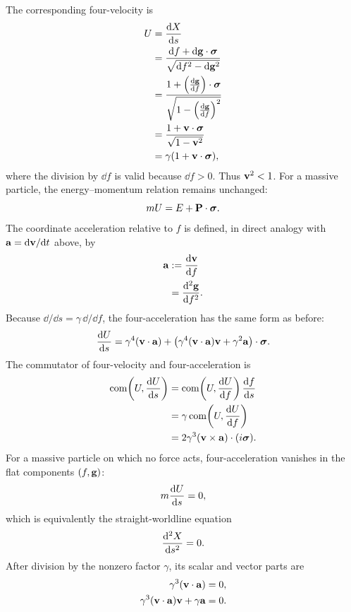 The corresponding four-velocity is
\begin{align*}
U
&=\frac{\mathrm dX}{\mathrm d s}\notag\\
&=\frac{\mathrm d f+\mathrm d\mathbf{g}\cdot\mathbf{\bm{\sigma}}}{\sqrt{\mathrm d f^2-\mathrm d\mathbf{g}^2}}\notag\\
&=\frac{1+\left(\frac{\mathrm d\mathbf{g}}{\mathrm d f}\right)\cdot\mathbf{\bm{\sigma}}}{\sqrt{1-\left(\frac{\mathrm d\mathbf{g}}{\mathrm d f}\right)^2}}\notag\\
&=\frac{1+\mathbf{v}\cdot\mathbf{\bm{\sigma}}}{\sqrt{1-\mathbf{v}^2}}\notag\\
&=\gamma(1+\mathbf{v}\cdot\mathbf{\bm{\sigma}}),
\end{align*}
where the division by \(\dd f\) is valid because \(\dd f>0\).
Thus \(\mathbf{v}^2<1\). For a massive particle, the energy--momentum relation remains unchanged:
\begin{equation*}
mU=E+\mathbf{P}\cdot\mathbf{\bm{\sigma}}.
\end{equation*}
The coordinate acceleration relative to \(f\) is defined, in direct analogy
with \(\mathbf{a}=\mathrm d\mathbf{v}/\mathrm d t\) above, by
\begin{align*}
\mathbf{a}
&:=\frac{\mathrm d\mathbf{v}}{\mathrm d f}\notag\\
&=\frac{\mathrm d^2\mathbf{g}}{\mathrm d f^2}.
\end{align*}
Because \(\dd/\dd s=\gamma\,\dd/\dd f\), the four-acceleration has the same form as before:
\begin{equation*}
\frac{\mathrm dU}{\mathrm d s}
=\gamma^4(\mathbf{v}\cdot\mathbf{a})
+\bigl(\gamma^4(\mathbf{v}\cdot\mathbf{a})\mathbf{v}+\gamma^2\mathbf{a}\bigr)\cdot\mathbf{\bm{\sigma}}.
\end{equation*}
The commutator of four-velocity and four-acceleration is
\begin{align*}
\operatorname{com}\!\left(U,\dfrac{\mathrm dU}{\mathrm d s}\right)
&=\operatorname{com}\!\left(U,\dfrac{\mathrm dU}{\mathrm d f}\right)\frac{\mathrm d f}{\mathrm d s}\notag\\
&=\gamma\operatorname{com}\!\left(U,\dfrac{\mathrm dU}{\mathrm d f}\right)\notag\\
&=2\gamma^3(\mathbf{v}\times\mathbf{a})\cdot(i\mathbf{\bm{\sigma}}).
\end{align*}
For a massive particle on which no force acts, four-acceleration vanishes in
the flat components \((f,\mathbf{g})\):
\begin{equation*}
m\frac{\mathrm dU}{\mathrm d s}=0,
\end{equation*}
which is equivalently the straight-worldline equation
\begin{equation*}
\frac{\mathrm d^2X}{\mathrm d s^2}=0.
\end{equation*}
After division by the nonzero factor \(\gamma\), its scalar and vector parts are
\begin{align*}
\gamma^3(\mathbf{v}\cdot\mathbf{a})&=0,\\
\gamma^3(\mathbf{v}\cdot\mathbf{a})\mathbf{v}+\gamma\mathbf{a}&=0.
\end{align*}
